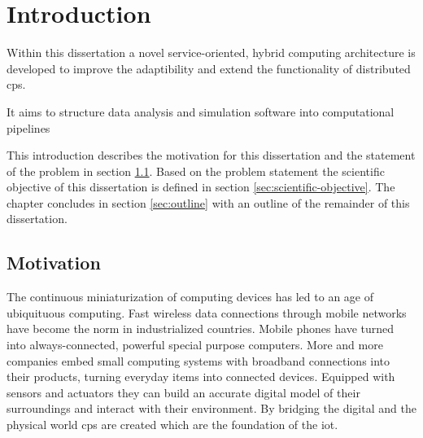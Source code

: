 \chapter{Introduction}
\label{sec:introduction}
Within this dissertation a novel service-oriented, hybrid computing architecture is developed to improve the adaptibility and extend the functionality of distributed \ac{cps}.


It aims to structure data analysis and simulation software into computational pipelines 

This introduction describes the motivation for this dissertation and the statement of the problem in section \ref{sec:motivation}.
Based on the problem statement the scientific objective of this dissertation is defined in section \ref{sec:scientific-objective}.
The chapter concludes in section \ref{sec:outline} with an outline of the remainder of this dissertation.

\section{Motivation}
\label{sec:motivation}
The continuous miniaturization of computing devices has led to an age of ubiquituous computing.
Fast wireless data connections through mobile networks have become the norm in industrialized countries.
Mobile phones have turned into always-connected, powerful special purpose computers.
More and more companies embed small computing systems with broadband connections into their products, turning everyday items into connected devices.
Equipped with sensors and actuators they can build an accurate digital model of their surroundings and interact with their environment.
By bridging the digital and the physical world \ac{cps} are created which are the foundation of the \ac{iot}.


